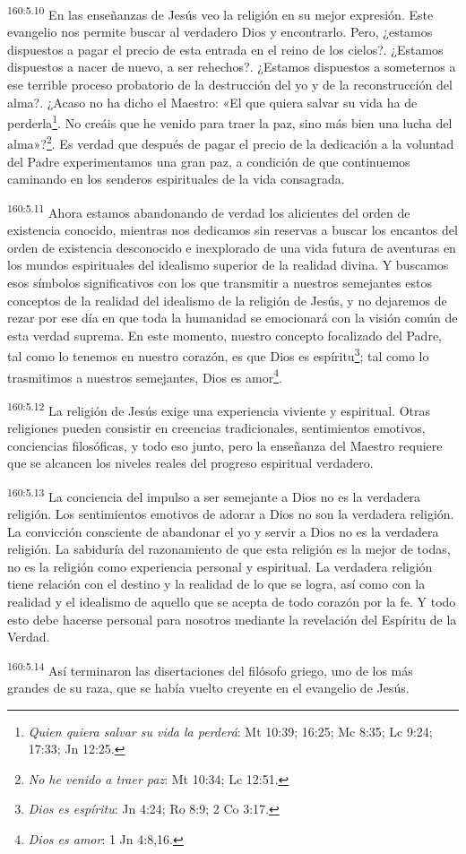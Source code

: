 \par 
\textsuperscript{160:5.10} En las enseñanzas de Jesús veo la religión en su mejor expresión. Este evangelio nos permite buscar al verdadero Dios y encontrarlo. Pero, ¿estamos dispuestos a pagar el precio de esta entrada en el reino de los cielos?. ¿Estamos dispuestos a nacer de nuevo, a ser rehechos?. ¿Estamos dispuestos a someternos a ese terrible proceso probatorio de la destrucción del yo y de la reconstrucción del alma?. ¿Acaso no ha dicho el Maestro: «El que quiera salvar su vida ha de perderla\footnote{\textit{Quien quiera salvar su vida la perderá}: Mt 10:39; 16:25; Mc 8:35; Lc 9:24; 17:33; Jn 12:25.}. No creáis que he venido para traer la paz, sino más bien una lucha del alma»?\footnote{\textit{No he venido a traer paz}: Mt 10:34; Lc 12:51.}. Es verdad que después de pagar el precio de la dedicación a la voluntad del Padre experimentamos una gran paz, a condición de que continuemos caminando en los senderos espirituales de la vida consagrada.

\par 
\textsuperscript{160:5.11} Ahora estamos abandonando de verdad los alicientes del orden de existencia conocido, mientras nos dedicamos sin reservas a buscar los encantos del orden de existencia desconocido e inexplorado de una vida futura de aventuras en los mundos espirituales del idealismo superior de la realidad divina. Y buscamos esos símbolos significativos con los que transmitir a nuestros semejantes estos conceptos de la realidad del idealismo de la religión de Jesús, y no dejaremos de rezar por ese día en que toda la humanidad se emocionará con la visión común de esta verdad suprema. En este momento, nuestro concepto focalizado del Padre, tal como lo tenemos en nuestro corazón, es que Dios es espíritu\footnote{\textit{Dios es espíritu}: Jn 4:24; Ro 8:9; 2 Co 3:17.}; tal como lo trasmitimos a nuestros semejantes, Dios es amor\footnote{\textit{Dios es amor}: 1 Jn 4:8,16.}.

\par 
\textsuperscript{160:5.12} La religión de Jesús exige una experiencia viviente y espiritual. Otras religiones pueden consistir en creencias tradicionales, sentimientos emotivos, conciencias filosóficas, y todo eso junto, pero la enseñanza del Maestro requiere que se alcancen los niveles reales del progreso espiritual verdadero.

\par 
\textsuperscript{160:5.13} La conciencia del impulso a ser semejante a Dios no es la verdadera religión. Los sentimientos emotivos de adorar a Dios no son la verdadera religión. La convicción consciente de abandonar el yo y servir a Dios no es la verdadera religión. La sabiduría del razonamiento de que esta religión es la mejor de todas, no es la religión como experiencia personal y espiritual. La verdadera religión tiene relación con el destino y la realidad de lo que se logra, así como con la realidad y el idealismo de aquello que se acepta de todo corazón por la fe. Y todo esto debe hacerse personal para nosotros mediante la revelación del Espíritu de la Verdad.

\par 
\textsuperscript{160:5.14} Así terminaron las disertaciones del filósofo griego, uno de los más grandes de su raza, que se había vuelto creyente en el evangelio de Jesús.